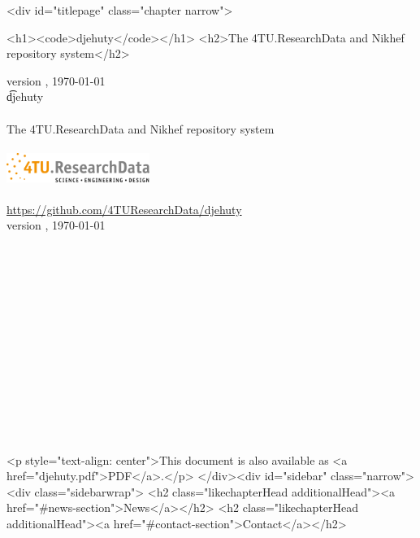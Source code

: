 \documentclass[12pt,a4paper]{book}
\begin{document}
{{{{{{\ifdefined\HCode
\begin{html}
<div id="titlepage" class="chapter narrow">
\end{html}
\fi
\begin{titlepage}
  \begin{center}
    \ifdefined\HCode
      \begin{html}
        <h1><code>djehuty</code></h1>
        <h2>The 4TU.ResearchData and Nikhef repository system</h2>
      \end{html}
      version \djehutyversion{}, \today{}~\\
    \else
      \vspace*{\fill}
      { \Huge \t{djehuty} }~\\~\\
      { \Large The 4TU.ResearchData and Nikhef repository system }~\\~\\
      \includegraphics[width=0.35\textwidth]{figures/logo.pdf}
      ~\\~\\
      \url{https://github.com/4TUResearchData/djehuty}~\\
       version \djehutyversion{}, \today{}
       ~\\~\\~\\~\\~\\~\\~\\~\\~\\~\\~\\~\\~\\~\\
       \vspace*{\fill}
    \fi
  \end{center}
  \thispagestyle{empty}
\end{titlepage}

\setcounter{page}{1}
\hypersetup{linkcolor=black}

\ifdefined\HCode
\begin{html}
<p style="text-align: center">This document is also available as <a href="djehuty.pdf">PDF</a>.</p>
</div><div id="sidebar" class="narrow"><div class="sidebarwrap">
<h2 class="likechapterHead additionalHead"><a href="#news-section">News</a></h2>
<h2 class="likechapterHead additionalHead"><a href="#contact-section">Contact</a></h2>
\end{html}
\renewcommand{\contentsname}{\href{\#titlepage}{Documentation}}
\fi

}}}}}}
\end{document}
